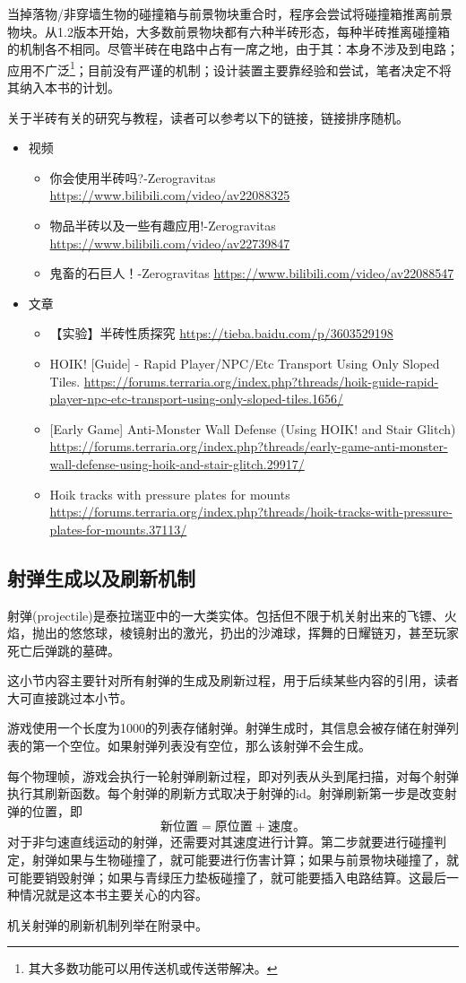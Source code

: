 当掉落物/非穿墙生物的碰撞箱与前景物块重合时，程序会尝试将碰撞箱推离前景物块。从1.2版本开始，大多数前景物块都有六种半砖形态，每种半砖推离碰撞箱的机制各不相同。尽管半砖在电路中占有一席之地，由于其：本身不涉及到电路；应用不广泛\footnote{其大多数功能可以用传送机或传送带解决。}；目前没有严谨的机制；设计装置主要靠经验和尝试，笔者决定不将其纳入本书的计划。

关于半砖有关的研究与教程，读者可以参考以下的链接，链接排序随机。

\begin{itemize}
\item 视频
\begin{itemize}
\item 你会使用半砖吗?-Zerogravitas \url{https://www.bilibili.com/video/av22088325}
\item 物品半砖以及一些有趣应用!-Zerogravitas \url{https://www.bilibili.com/video/av22739847}
\item 鬼畜的石巨人！-Zerogravitas \url{https://www.bilibili.com/video/av22088547}
\end{itemize}
\item 文章
\begin{itemize}
\item 【实验】半砖性质探究 \url{https://tieba.baidu.com/p/3603529198}
\item HOIK! [Guide] - Rapid Player/NPC/Etc Transport Using Only Sloped Tiles. \url{https://forums.terraria.org/index.php?threads/hoik-guide-rapid-player-npc-etc-transport-using-only-sloped-tiles.1656/}
\item {[}Early Game] Anti-Monster Wall Defense (Using HOIK! and Stair Glitch) \url{https://forums.terraria.org/index.php?threads/early-game-anti-monster-wall-defense-using-hoik-and-stair-glitch.29917/}
\item Hoik tracks with pressure plates for mounts \url{https://forums.terraria.org/index.php?threads/hoik-tracks-with-pressure-plates-for-mounts.37113/}
\end{itemize}
\end{itemize}

\subsection{射弹生成以及刷新机制}
射弹(projectile)是泰拉瑞亚中的一大类实体。包括但不限于机关射出来的飞镖、火焰，抛出的悠悠球，棱镜射出的激光，扔出的沙滩球，挥舞的日耀链刃，甚至玩家死亡后弹跳的墓碑。

这小节内容主要针对所有射弹的生成及刷新过程，用于后续某些内容的引用，读者大可直接跳过本小节。

游戏使用一个长度为1000的列表存储射弹。射弹生成时，其信息会被存储在射弹列表的第一个空位。如果射弹列表没有空位，那么该射弹不会生成。

每个物理帧，游戏会执行一轮射弹刷新过程，即对列表从头到尾扫描，对每个射弹执行其刷新函数。每个射弹的刷新方式取决于射弹的id。射弹刷新第一步是改变射弹的位置，即$$\textrm{新位置}=\textrm{原位置}+\textrm{速度。}$$对于非匀速直线运动的射弹，还需要对其速度进行计算。第二步就要进行碰撞判定，射弹如果与生物碰撞了，就可能要进行伤害计算；如果与前景物块碰撞了，就可能要销毁射弹；如果与青绿压力垫板碰撞了，就可能要插入电路结算。这最后一种情况就是这本书主要关心的内容。

机关射弹的刷新机制列举在附录中。